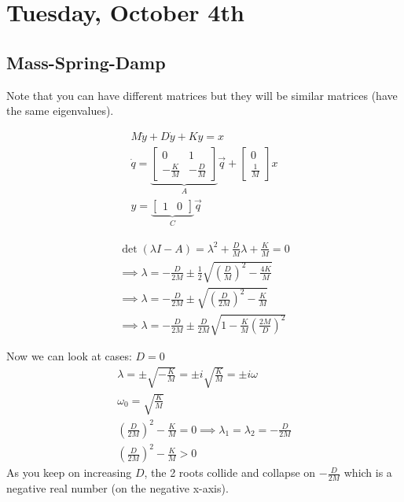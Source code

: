 \section{Tuesday, October 4th}
\subsection{Mass-Spring-Damp}
Note that you can have different matrices but they will be similar matrices (have the same eigenvalues).

\begin{align*}
    M\ddot y+D\dot y+Ky=x
    \\
    \dot q = \underbrace{\begin{bmatrix}0&1\\-\frac KM&-\frac DM\end{bmatrix}}_A \vec q+\begin{bmatrix}
        0\\
        \frac1M
    \end{bmatrix}
    x
    \\
    y = \underbrace{\begin{bmatrix}1&0\end{bmatrix}}_C \vec q
\end{align*}

\begin{align*}
    \det(\lambda I-A) = \lambda^2+\frac DM \lambda +\frac KM = 0
    \\
    \implies
    \lambda=-\frac D{2M}\pm\frac12\sqrt{\left(\frac{D}{M}\right)^2 - \frac{4K}{M}}
    \\
    \implies
    \lambda=-\frac D{2M}\pm\sqrt{\left(\frac{D}{2M}\right)^2 - \frac{K}{M}}
    \\
    \implies
    \lambda=-\frac D{2M}\pm\frac D{2M}\sqrt{1 - \frac{K}{M}\left(\frac{2M}{D}\right)^2}
\end{align*}

\hrulefill

Now we can look at cases: $D=0$
\begin{align*}
    \lambda = \pm\sqrt{-\frac KM}
    = \pm i\sqrt{\frac KM}= \pm i\omega
    \\
    \omega_0 = \sqrt{\frac{K}{M}}
    \\
    \left(\frac{D}{2M}\right)^2 - \frac KM = 0 
    \implies \lambda_1 = \lambda_2 = -\frac{D}{2M}
    \\
    \left(\frac{D}{2M}\right)^2 - \frac KM > 0 
\end{align*}
As you keep on increasing $D$, the 2 roots collide and collapse on $-\frac D{2M}$ which is a negative real number (on the negative x-axis).

